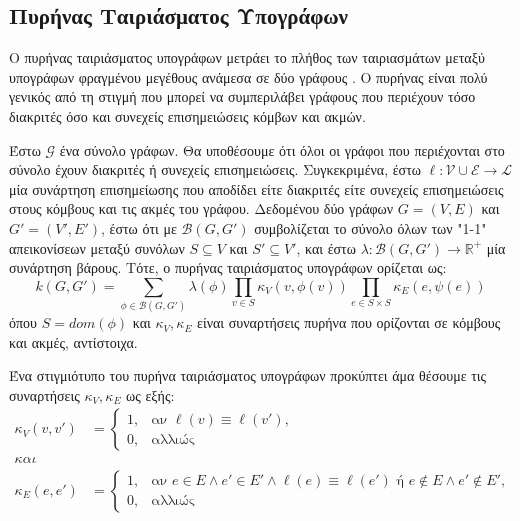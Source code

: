 \subsection{Πυρήνας Ταιριάσματος Υπογράφων}
\label{ssec:sm}
Ο πυρήνας ταιριάσματος υπογράφων μετράει το πλήθος των ταιριασμάτων μεταξύ υπογράφων φραγμένου μεγέθους ανάμεσα σε δύο γράφους \cite{Kriege2012SubgraphMK}.
Ο πυρήνας είναι πολύ γενικός από τη στιγμή που μπορεί να συμπεριλάβει γράφους που περιέχουν τόσο διακριτές όσο και συνεχείς επισημειώσεις κόμβων και ακμών.\par
Έστω $\mathcal{G}$ ένα σύνολο γράφων.
Θα υποθέσουμε ότι όλοι οι γράφοι που περιέχονται στο σύνολο έχουν διακριτές ή συνεχείς επισημειώσεις.
Συγκεκριμένα, έστω $\ell : \mathcal{V} \cup \mathcal{E} \rightarrow \mathcal{L}$ μία συνάρτηση επισημείωσης που αποδίδει είτε διακριτές είτε συνεχείς επισημειώσεις στους κόμβους και τις ακμές του γράφου.
Δεδομένου δύο γράφων $G=(V,E)$ και $G'=(V',E')$, έστω ότι με $\mathcal{B}(G, G')$ συμβολίζεται το σύνολο όλων των "1-1" απεικονίσεων μεταξύ συνόλων $S \subseteq V$ και $S' \subseteq V'$, και έστω $\lambda : \mathcal{B}(G,G') \rightarrow \mathbb{R}^+$ μία συνάρτηση βάρους.
Τότε, ο πυρήνας ταιριάσματος υπογράφων ορίζεται ως:
\begin{equation}
    k(G, G') = \sum_{\phi \in \mathcal{B}(G,G')} \lambda(\phi) \prod_{v \in S} \kappa_V(v, \phi(v)) \prod_{e \in S \times S} \kappa_E(e, \psi(e))
\end{equation}
όπου $S = dom(\phi)$ και $\kappa_V, \kappa_E$ είναι συναρτήσεις πυρήνα που ορίζονται σε κόμβους και ακμές, αντίστοιχα.\par
Ένα στιγμιότυπο του πυρήνα ταιριάσματος υπογράφων προκύπτει άμα θέσουμε τις συναρτήσεις $\kappa_V, \kappa_E$ ως εξής:
\begin{equation}
    \begin{split}
        \kappa_V(v,v') &= \begin{cases}
        1, & \text{αν $\ell(v) \equiv \ell(v')$},\\
        0, & \text{αλλιώς} 
        \end{cases}\\
        και\\
        \kappa_E(e,e') &= \begin{cases}
        1, & \text{αν $e \in E \wedge e' \in E' \wedge \ell(e) \equiv \ell(e')$ ή $e \not \in E \wedge e' \not \in E'$},\\
        0, & \text{αλλιώς}
        \end{cases}
    \end{split}
\end{equation}
